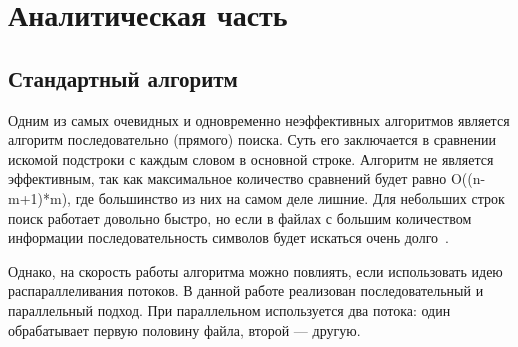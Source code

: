 \section{Аналитическая часть}

\subsection{Стандартный алгоритм}
Одним из самых очевидных и одновременно неэффективных алгоритмов является алгоритм последовательно (прямого) поиска. 
Суть его заключается в сравнении искомой подстроки с каждым словом в основной строке. 
Алгоритм не является эффективным, так как максимальное количество сравнений будет равно O((n-m+1)*m), где большинство из них на самом деле лишние. 
Для небольших строк поиск работает довольно быстро, но если в файлах с большим количеством информации последовательность символов будет искаться очень долго~\cite{вирт2010алгоритмы}.

Однако, на скорость работы алгоритма можно повлиять, если использовать идею распараллеливания потоков.
В данной работе реализован последовательный и параллельный подход.
При параллельном используется два потока: один обрабатывает первую половину файла, второй --- другую.